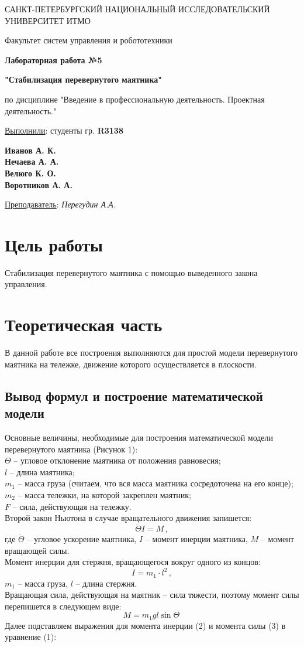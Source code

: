 \documentclass[a5paper, 10pt]{article}
\theoremstyle{definition}
\theoremstyle{plain}
\theoremstyle{remark}
\newcommand*{\titlePage}{
	\thispagestyle{title}
	\begingroup
	\begin{center}
		\vspace*{6ex}
		
		{\small
			САНКТ-ПЕТЕРБУРГСКИЙ НАЦИОНАЛЬНЫЙ ИССЛЕДОВАТЕЛЬСКИЙ УНИВЕРСИТЕТ ИТМО
		}
		
		\vspace*{2ex}
		
		{\normalsize
			Факультет систем управления и робототехники
		}
		
		\vspace*{15ex}
		
		{\Large \bfseries 
			Лабораторная работа  №5
		}

                     \vspace*{2ex}
{\Large \bfseries 
			"Стабилизация перевернутого маятника"
		}

                     \vspace*{2ex}
		
		{\normalsize
			по дисциплине "Введение в профессиональную деятельность. Проектная деятельность."
		}
                     \vspace*{2ex}
	\end{center}
	\vspace*{10ex}
	\begin{flushright}
		{\large 
			\underline{Выполнили}: студенты гр. \textbf{R3138}\\
			\begin{flushright}
				\textbf{Иванов А. К.}\\
                                           \textbf{Нечаева А. А.}\\
                                           \textbf{Велюго К. О.}\\
                                           \textbf{Воротников А. А.}\\
			\end{flushright}
		}
		
		\vspace*{5ex}
		
		{\large 
			\underline{Преподаватель}: \textit{Перегудин А.А.}
		}
	\end{flushright}	
	\newpage
	\setcounter{page}{2}
	\endgroup}
\begin{document}
	\titlePage
	\pagestyle{style}


\newpage
\section{Цель работы}
Стабилизация перевернутого маятника с помощью выведенного закона управления.
\section{Теоретическая часть}	
В данной работе все построения выполняются для простой модели перевернутого маятника на тележке, движение которого осуществляется в плоскости.

\subsection{Вывод формул и построение математической модели}	
Основные величины, необходимые для построения математической модели перевернутого маятника (Рисунок 1):\\
$\Theta $ -- угловое отклонение маятника от положения равновесия;\\
$l$ -- длина маятника;\\
$m_1$ -- масса груза (считаем, что вся масса маятника сосредоточена на его конце);\\
$m_2$ -- масса тележки, на которой закреплен маятник;\\
$F$ -- сила, действующая на тележку.\\
Второй закон Ньютона в случае вращательного движения запишется:
\begin{equation}
\ddot{\Theta}I = M \, ,
\end{equation}
где $\ddot{\Theta}$ -- угловое ускорение маятника, $I$ -- момент инерции маятника, $M$ -- момент вращающей силы.\\
Момент инерции для стержня, вращающегося вокруг одного из концов:
\begin{equation}
I = m_1 \cdot l^2 \, ,
\end{equation}
$m_1$ -- масса груза, $l$ -- длина стержня.\\
Вращающая сила, действующая на маятник -- сила тяжести, поэтому момент силы перепишется в следующем виде:
\begin{equation}
M = m_1 g l \sin \Theta \, 
\end{equation}
Далее подставляем выражения для момента инерции (2) и момента силы (3) в уравнение (1):
 
\end{document}
